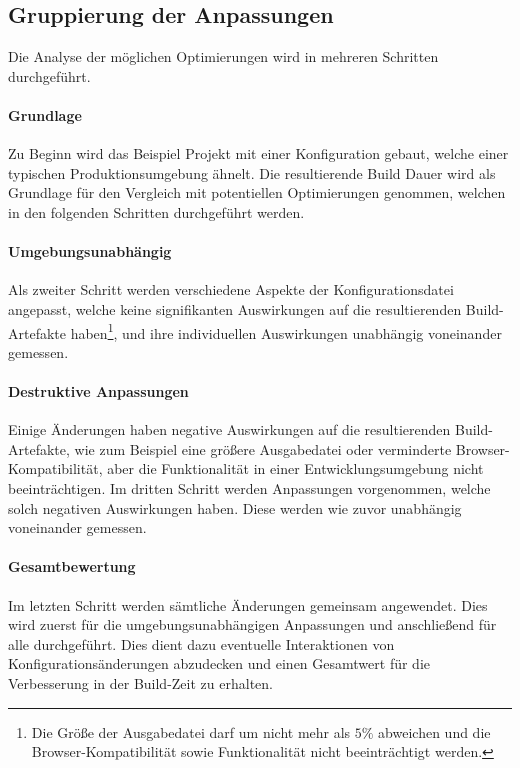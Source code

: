 \documentclass[11pt]{report}
\begin{document}
			\subsection{Gruppierung der Anpassungen}
				Die Analyse der möglichen Optimierungen wird in mehreren Schritten durchgeführt.
				\paragraph{Grundlage}\label{baseline-build} Zu Beginn wird das Beispiel Projekt mit einer Konfiguration gebaut, welche einer typischen Produktionsumgebung ähnelt. Die resultierende Build Dauer wird als Grundlage für den Vergleich mit potentiellen Optimierungen genommen, welchen in den folgenden Schritten durchgeführt werden.

				\paragraph{Umgebungsunabhängig} Als zweiter Schritt werden verschiedene Aspekte der Konfigurationsdatei angepasst, welche keine signifikanten Auswirkungen auf die resultierenden Build-Artefakte haben\footnote{Die Größe der Ausgabedatei darf um nicht mehr als $5\%$ abweichen und die Browser-Kompatibilität sowie Funktionalität nicht beeinträchtigt werden.}, und ihre individuellen Auswirkungen unabhängig voneinander gemessen.

				\paragraph{Destruktive Anpassungen} Einige Änderungen haben negative Auswirkungen auf die resultierenden Build-Artefakte, wie zum Beispiel eine größere Ausgabedatei oder verminderte Browser-Kompatibilität, aber die Funktionalität in einer Entwicklungsumgebung nicht beeinträchtigen. Im dritten Schritt werden Anpassungen vorgenommen, welche solch negativen Auswirkungen haben. Diese werden wie zuvor unabhängig voneinander gemessen.

				\paragraph{Gesamtbewertung} Im letzten Schritt werden sämtliche Änderungen gemeinsam angewendet. Dies wird zuerst für die umgebungsunabhängigen Anpassungen und anschließend für alle durchgeführt. Dies dient dazu eventuelle Interaktionen von Konfigurationsänderungen abzudecken und einen Gesamtwert für die Verbesserung in der Build-Zeit zu erhalten.
\end{document}
